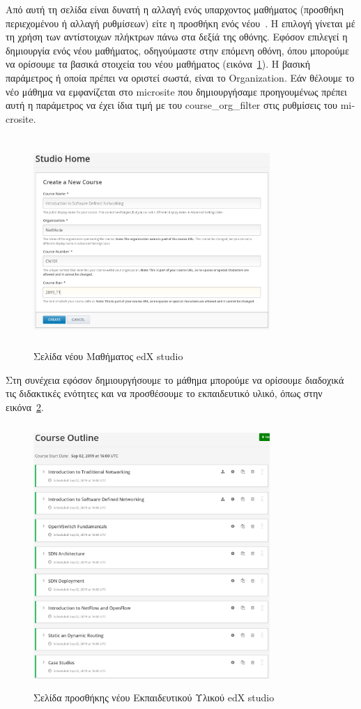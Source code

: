 \documentclass[12pt]{report}
\begin{document}
Από αυτή τη σελίδα είναι δυνατή η αλλαγή ενός υπαρχοντος μαθήματος (προσθήκη περιεχομένου ή αλλαγή ρυθμίσεων) είτε η προσθήκη ενός νέου~\cite{edxdata_package_2}. Η επιλογή γίνεται μέ τη χρήση των αντίστοιχων πλήκτρων πάνω στα δεξίά της οθόνης. Εφόσον επιλεγεί η δημιουργία ενός νέου μαθήματος, οδηγούμαστε στην επόμενη οθόνη, όπου μπορούμε να ορίσουμε τα βασικά στοιχεία του νέου μαθήματος (εικόνα~\ref{fig:edx-studio-new-course}). Η βασική παράμετρος ή οποία πρέπει να οριστεί σωστά, είναι το \textlatin{Organization}. Εάν θέλουμε το νέο μάθημα να εμφανίζεται στο \textlatin{microsite} που δημιουργήσαμε προηγουμένως πρέπει αυτή η παράμετρος να έχει ίδια τιμή με του \textlatin{course\_org\_filter} στις ρυθμίσεις του \textlatin{microsite}.
\begin{figure}[!htbp]
\centering
\includegraphics[width=0.8\textwidth, height=8cm]{edx-studio-new-course}
\caption{Σελίδα νέου Μαθήματος \textlatin{edX studio}}
\label{fig:edx-studio-new-course}
\end{figure}

Στη συνέχεια εφόσον δημιουργήσουμε το μάθημα μπορούμε να ορίσουμε διαδοχικά τις διδακτικές ενότητες και να προσθέσουμε το εκπαιδευτικό υλικό, όπως στην εικόνα~\ref{fig:edx-studio-course-outline}.
\begin{figure}[!htbp]
\centering
\includegraphics[width=0.8\textwidth, height=10cm]{edx-studio-course-outline}
\caption{Σελίδα προσθήκης νέου Εκπαιδευτικού Υλικού \textlatin{edX studio}}
\label{fig:edx-studio-course-outline}
\end{figure}
\end{document}
